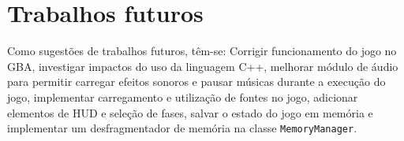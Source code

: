 \section{Trabalhos futuros}

Como sugestões de trabalhos futuros, têm-se: Corrigir funcionamento do jogo no GBA, investigar impactos do uso da linguagem C++, melhorar módulo de áudio para permitir carregar efeitos sonoros e pausar músicas durante a execução do jogo, implementar carregamento e utilização de fontes no jogo, adicionar elementos de HUD e seleção de fases, salvar o estado do jogo em memória e implementar um desfragmentador de memória na classe \texttt{MemoryManager}.
